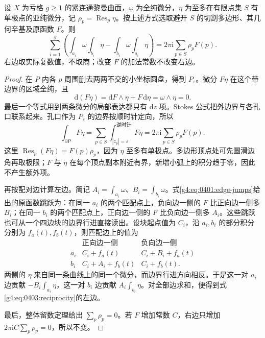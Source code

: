 \begin{proposition}
	\label{g4:prop:0403:reciprocity}
	设 \(X\) 为亏格 \(g\ge1\) 的紧连通黎曼曲面，\(\omega\) 为全纯微分，\(\eta\) 为至多在有限点集 \(S\) 有单极点的亚纯微分，记 \(\rho_p=\operatorname{Res}_p\eta\)。按上述方式选取避开 \(S\) 的切割多边形、其几何辛基及原函数 \(F\)。则
	\begin{equation}
		\label{g4:eq:0403:reciprocity}
		\sum_{i=1}^g
		\left(
			\int_{a_i}\omega\int_{b_i}\eta
			-\int_{b_i}\omega\int_{a_i}\eta
		\right)
		=2\pi\mathrm{i}\sum_{p\in S}\rho_pF(p).
	\end{equation}
	右边取实际复数值，不取商；改变 \(F\) 的加法常数不改变右边。
\end{proposition}
\begin{proof}
	在 \(P\) 内各 \(p\) 周围删去两两不交的小坐标圆盘，得到 \(P_\varepsilon\)。微分 \(F\eta\) 在这个带边界的区域全纯，且
	\[
		\mathrm{d}(F\eta)=\mathrm{d}F\wedge\eta+F\,\mathrm{d}\eta
		=\omega\wedge\eta=0.
	\]
	最后一个等式用到两条微分的局部表达都只有 \(\mathrm{d}z\) 项。Stokes 公式把外边界与各孔口联系起来。孔口作为 \(P_\varepsilon\) 的边界按顺时针定向，所以
	\[
		\int_{\partial P}F\eta
		=\sum_{p\in S}\int_{|z_p|=\varepsilon}^{\text{逆时针}}F\eta
		=2\pi\mathrm{i}\sum_{p\in S}\rho_pF(p).
	\]
	这里 \(\operatorname{Res}_p(F\eta)=F(p)\rho_p\)，因为 \(\eta\) 至多有单极点。多边形顶点处可先圆滑边角再取极限；\(F\) 与 \(\eta\) 在每个顶点副本附近有界，新增小弧上的积分趋于零，因此不产生额外项。

	再按配对边计算左边。简记 \(A_i=\int_{a_i}\omega\)、\(B_i=\int_{b_i}\omega\)。式\eqref{g4:eq:0401:edge-jumps}给出的原函数跳跃为：在同一 \(a_i\) 的两个匹配点上，负向边一侧的 \(F\) 比正向边一侧多 \(B_i\)；在同一 \(b_i\) 的两个匹配点上，正向边一侧的 \(F\) 比负向边一侧多 \(A_i\)。这些跳跃也可从一个四边块的边界行进直接读出。设块起点值为 \(C_i\)，沿 \(a_i,b_i\) 的部分积分分别为 \(f_a(t),f_b(t)\)，则匹配边上的值为
	\[
		\begin{array}{c|cc}
			&\text{正向边一侧}&\text{负向边一侧}\\ \hline
			a_i&C_i+f_a(t)&C_i+B_i+f_a(t)\\
			b_i&C_i+A_i+f_b(t)&C_i+f_b(t).
		\end{array}
	\]
	两侧的 \(\eta\) 来自同一条曲线上的同一个微分，而边界行进方向相反。于是这一对 \(a_i\) 边贡献 \(-B_i\int_{a_i}\eta\)，这一对 \(b_i\) 边贡献 \(A_i\int_{b_i}\eta\)。对全部边求和，便得到式\eqref{g4:eq:0403:reciprocity}的左边。

	最后，整体留数定理给出 \(\sum_p\rho_p=0\)。若 \(F\) 增加常数 \(C\)，右边只增加 \(2\pi\mathrm{i}C\sum_p\rho_p=0\)，所以不变。
\end{proof}

